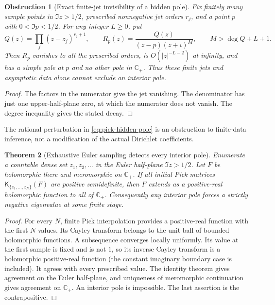 \documentclass[11pt]{article}
\newtheorem{theorem}{Theorem}[section]
\newtheorem{obstruction}[theorem]{Obstruction}
\theoremstyle{definition}
\theoremstyle{remark}
\newcommand{\C}{\mathbb C}
\begin{document}
\begin{obstruction}[Exact finite-jet invisibility of a hidden pole]
\label{obs:pick-hidden-pole}
Fix finitely many sample points in $\Im z>1/2$, prescribed nonnegative
jet orders $r_j$, and a point $p$ with $0<\Im p<1/2$.
For any integer $L\ge0$, put
\begin{equation}
 Q(z)=\prod_j(z-z_j)^{r_j+1},\qquad
 R_p(z)=\frac{Q(z)}{(z-p)(z+i)^M},\qquad
 M>\deg Q+L+1.
 \label{eq:pick-hidden-pole}
\end{equation}
Then $R_p$ vanishes to all the prescribed orders, is $O(|z|^{-L-2})$
at infinity, and has a simple pole at $p$ and no other pole in
$\C_+$.  Thus these finite jets and asymptotic data alone cannot
exclude an interior pole.
\end{obstruction}

\begin{proof}
The factors in the numerator give the jet vanishing.  The denominator
has just one upper-half-plane zero, at which the numerator does not
vanish.  The degree inequality gives the stated decay.
\end{proof}

The rational perturbation in \eqref{eq:pick-hidden-pole} is an
obstruction to finite-data inference, not a modification of the actual
Dirichlet coefficients.

\begin{theorem}[Exhaustive Euler sampling detects every interior pole]
\label{thm:pick-exhaustive}
Enumerate a countable dense set $z_1,z_2,\ldots$ in the Euler
half-plane $\Im z>1/2$.  Let $F$ be holomorphic there and meromorphic
on $\C_+$.  If all initial Pick matrices
$\mathsf K_{\{z_1,\ldots,z_N\}}(F)$ are positive semidefinite, then
$F$ extends as a positive-real holomorphic function to all of $\C_+$.
Consequently any interior pole forces a strictly negative eigenvalue
at some finite stage.
\end{theorem}

\begin{proof}
For every $N$, finite Pick interpolation provides a positive-real
function with the first $N$ values.  Its Cayley transform belongs to
the unit ball of bounded holomorphic functions.  A subsequence
converges locally uniformly.  Its value at the first sample is fixed
and is not $1$, so its inverse Cayley transform is a holomorphic
positive-real function (the constant imaginary boundary case is
included).  It agrees with every prescribed value.  The identity
theorem gives agreement on the Euler half-plane, and uniqueness of
meromorphic continuation gives agreement on $\C_+$.  An interior
pole is impossible.  The last assertion is the contrapositive.
\end{proof}
\end{document}

